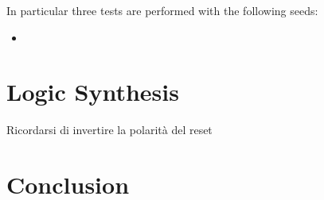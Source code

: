 \documentclass[a4paper]{report}
\begin{document}
\noindent In particular three tests are performed with the following seeds:
\begin{itemize}
	\item
\end{itemize}

\chapter{Logic Synthesis}
Ricordarsi di invertire la polarità del reset


\chapter{Conclusion}
\end{document}
